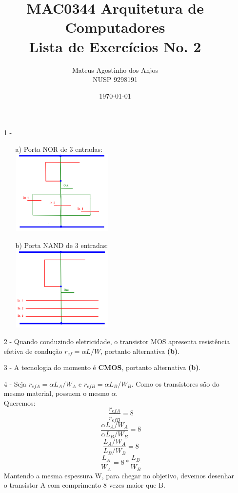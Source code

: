 \documentclass[12pt]{article}
\title{MAC0344 Arquitetura de Computadores\\
Lista de Exercícios No. 2
}
\author{Mateus Agostinho dos Anjos\\NUSP 9298191}
\date{\today}
\begin{document}
	\maketitle
	\begin{itemize}
		\item[1 -]
			\hfill\\
			\begin{itemize}
				\item[a)]
					Porta NOR de 3 entradas: \\
					\includegraphics[width=5cm]{porta_NOR_3_entradas.png}
				\item[b)]
					Porta NAND de 3 entradas: \\
					\includegraphics[width=5cm]{porta_NAND_3_entradas.png}
			\end{itemize}
		\item[2 -]
			Quando conduzindo eletricidade, o transistor MOS apresenta
			resistência efetiva de condução $r_{ef} = \alpha L/W$,
			portanto alternativa \textbf{(b)}.
		\item[3 -]
			A tecnologia do momento é \textbf{CMOS}, portanto
			alternativa \textbf{(b)}.
		\item[4 -]
			Seja $r_{efA} = \alpha L_A/W_A$ e $r_{efB} = \alpha L_B/W_B$.
			Como os transistores são do mesmo material, possuem o mesmo
			$\alpha$.\\
			Queremos:
			$$\frac{r_{efA}}{r_{efB}} = 8$$
			$$\frac{\alpha L_A/W_A}{\alpha L_B/W_B} = 8$$
			$$\frac{L_A/W_A}{L_B/W_B} = 8$$
			$$\frac{L_A}{W_A} = 8 * \frac{L_B}{W_B}$$
			Mantendo a mesma espessura W, para chegar no objetivo, devemos
			desenhar o transistor A com comprimento 8 vezes maior que
			B.\\

\end{itemize}
\end{document}
